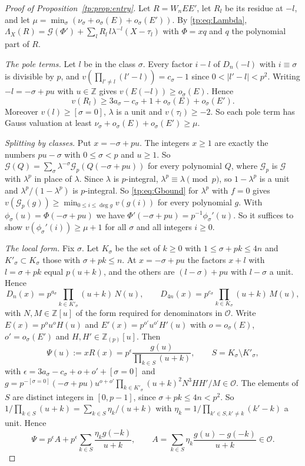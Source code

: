 \documentclass[11pt]{amsart}
\theoremstyle{definition}
\theoremstyle{remark}
\numberwithin{equation}{section}
\newcommand{\Z}{\mathbb Z}
\begin{document}
\begin{proof}[Proof of Proposition~\ref{tp:prop:entry}]
Let $R=W_nEE'$, let $R_l$ be its residue at $-l$, and let $\mu=\min_\sigma(\nu_\sigma+o_\sigma(E)+o_\sigma(E'))$. By
\eqref{tp:eq:Lambda}, $\Lambda_X(R)=\mathcal G(\Phi')+\sum_lR_l\,l\lambda^{-l}(X-\tau_l)$ with $\Phi=xq$ and $q$ the
polynomial part of $R$.

\emph{The pole terms.} Let $l$ be in the class $\sigma$. Every factor $i-l$ of $D_n(-l)$ with $i\equiv\sigma$ is
divisible by $p$, and $v(\prod_{l'\ne l}(l'-l))=c_\sigma-1$ since $0<|l'-l|<p^2$. Writing $-l=-\sigma+pu$ with
$u\in\Z$ gives $v(E(-l))\ge o_\sigma(E)$. Hence
\begin{equation}\label{tp:eq:resval}
 v(R_l)\ge3a_\sigma-c_\sigma+1+o_\sigma(E)+o_\sigma(E').
\end{equation}
Moreover $v(l)\ge[\sigma=0]$, $\lambda$ is a unit and $v(\tau_l)\ge-2$. So each pole term has Gauss valuation at least
$\nu_\sigma+o_\sigma(E)+o_\sigma(E')\ge\mu$.

\emph{Splitting by classes.} Put $x=-\sigma+pu$. The integers $x\ge1$ are exactly the numbers $pu-\sigma$ with
$0\le\sigma<p$ and $u\ge1$. So $\mathcal G(Q)=\sum_\sigma\lambda^{-\sigma}\mathcal G_p(Q(-\sigma+pu))$ for every
polynomial $Q$, where $\mathcal G_p$ is $\mathcal G$ with $\lambda^p$ in place of $\lambda$. Since $\lambda$ is
$p$-integral, $\lambda^p\equiv\lambda\pmod p$, so $1-\lambda^p$ is a unit and $\lambda^p/(1-\lambda^p)$ is $p$-integral. So
\eqref{tp:eq:Gbound} for $\lambda^p$ with $f=0$ gives $v(\mathcal G_p(g))\ge\min_{0\le i\le\deg g}v(g(i))$ for every polynomial $g$. With
$\phi_\sigma(u)=\Phi(-\sigma+pu)$ we have $\Phi'(-\sigma+pu)=p^{-1}\phi_\sigma'(u)$. So it suffices to show
$v(\phi_\sigma'(i))\ge\mu+1$ for all $\sigma$ and all integers $i\ge0$.

\emph{The local form.} Fix $\sigma$. Let $K_\sigma$ be the set of $k\ge0$ with $1\le\sigma+pk\le4n$ and
$K'_\sigma\subset K_\sigma$ those with $\sigma+pk\le n$. At $x=-\sigma+pu$ the factors $x+l$ with $l=\sigma+pk$ equal
$p(u+k)$, and the others are $(l-\sigma)+pu$ with $l-\sigma$ a unit. Hence
\[
 D_n(x)=p^{a_\sigma}\prod_{k\in K'_\sigma}(u+k)\,N(u),\qquad D_{4n}(x)=p^{c_\sigma}\prod_{k\in K_\sigma}(u+k)\,M(u),
\]
with $N,M\in\Z[u]$ of the form required for denominators in $\mathcal O$. Write $E(x)=p^ou^oH(u)$ and
$E'(x)=p^{o'}u^{o'}H'(u)$ with $o=o_\sigma(E)$, $o'=o_\sigma(E')$ and $H,H'\in\Z_{(p)}[u]$. Then
\[
 \Psi(u):=xR(x)=p^{\epsilon}\frac{g(u)}{\prod_{k\in S}(u+k)},\qquad S=K_\sigma\setminus K'_\sigma,
\]
with $\epsilon=3a_\sigma-c_\sigma+o+o'+[\sigma=0]$ and
$g=p^{-[\sigma=0]}(-\sigma+pu)u^{o+o'}\prod_{k\in K'_\sigma}(u+k)^2N^3HH'/M\in\mathcal O$. The elements of $S$ are
distinct integers in $[0,p-1]$, since $\sigma+pk\le4n<p^2$. So
$1/\prod_{k\in S}(u+k)=\sum_{k\in S}\eta_k/(u+k)$ with $\eta_k=1/\prod_{k'\in S,k'\ne k}(k'-k)$ a unit. Hence
\[
 \Psi=p^{\epsilon}A+p^{\epsilon}\sum_{k\in S}\frac{\eta_kg(-k)}{u+k},\qquad
 A=\sum_{k\in S}\eta_k\frac{g(u)-g(-k)}{u+k}\in\mathcal O .
\]


\end{proof}
\end{document}
